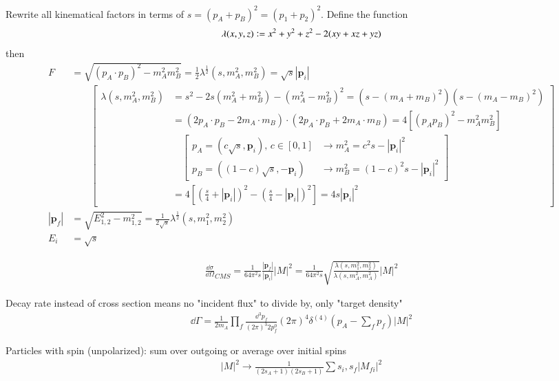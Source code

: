 Rewrite all kinematical factors in terms of $s=(p_A+p_B)^2=(p_1+p_2)^2$. Define the function
\begin{align}
	\lambda(x,y,z) \vcentcolon = x^2 + y^2 +z^2 -2(xy + xz + yz)
\end{align}
then
\begin{align*}
	F &= \sqrt{(p_A\cdot p_B)^2 - m_A^2 m_B^2} = \frac{1}{2} \lambda^{\frac{1}{2}}(s,m^2_A,m^2_B) = \sqrt{s} |\pmb{p}_i| \\
	  &\qquad \left[ \begin{array}{ll}
			  \lambda (s,m_A^2, m_B^2) &= s^2 -2s(m_A^2 + m_B^2)-(m_A^2 - m_B^2)^2 =  (s - (m_A + m_B)^2)(s - (m_A - m_B)^2) \\
									   &= (2p_A \cdot p_B -2 m_A\cdot m_B) \cdot (2p_A \cdot p_B + 2 m_A\cdot m_B) = 4 \left[ (p_A p_B)^2 - m_A^2 m_B^2 \right]  \\
									   &\quad \left[ 
					   \begin{array}{ll}
						   p_A = (c\sqrt{s}, \pmb{p}_i),\, c \in [0,1] &\rightarrow m^2_A = c^2s - |\pmb{p}_i|^2 \\
						   p_B = ((1-c)\sqrt{s}, -\pmb{p}_i) &\rightarrow m^2_B = (1-c)^2 s - |\pmb{p}_i|^2
						\end{array}
						\right] \\
									   & =4 \left[ (\frac{s}{4} + |\pmb{p}_i|)^2 -  (\frac{s}{4} - |\pmb{p}_i|)^2 \right] = 4 s |\pmb{p}_i|^2
				  \end{array} \right] \\
	|\pmb{p}_f| &= \sqrt{E^2_{1,2} - m_{1,2}^2} = \frac{1}{2\sqrt{s}} \lambda^{\frac{1}{2}}(s, m_1^2, m_2^2) \\
	E_i & = \sqrt{s}
\end{align*}

\begin{align}
	\frac{\dd \sigma}{\dd \Omega}_{CMS} = \frac{1}{64 \pi^2 s} \frac{|\pmb{p}_f|}{|\pmb{p}_i|}|M|^2 = \frac{1}{64\pi^2 s} \sqrt{\frac{\lambda(s, m_1^2, m_2^2)}{\lambda(s, m_A^2, m_A^2)}} |M|^2
\end{align}

Decay rate instead of cross section means no "incident flux" to divide by, only "target density"
\begin{align}
	\dd \Gamma = \frac{1}{2m_A} \prod_f \frac{\dd^3 p_f}{(2\pi)^3 2p_f^0} (2\pi)^4 \delta^{(4)}(p_A - \sum_f p_f) |M|^2
\end{align}

Particles with spin (unpolarized): sum over outgoing or average over initial spins
\begin{align}
	|M|^2 \rightarrow \frac{1}{(2s_A + 1)(2s_B + 1)} \sum{s_i, s_f} |M_{fi}|^2
\end{align}

